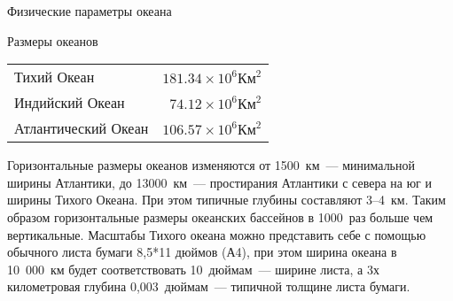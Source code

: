 \begin{chapter}{Физические параметры океана}
\begin{section}{Размеры океанов}
\begin{tabular}{lr}
Тихий Океан         & $181.34 \times 10^6 \mbox{Км}^2$ \\
Индийский Океан     & $ 74.12 \times 10^6 \mbox{Км}^2$ \\
Атлантический Океан & $106.57 \times 10^6 \mbox{Км}^2$ \\
\end{tabular}
%


Горизонтальные размеры океанов изменяются от 1500~км~--- минимальной
ширины Атлантики, до 13000~км~--- простирания Атлантики с севера на юг
и ширины Тихого Океана.  При этом типичные глубины составляют 3--4~км.
Таким образом горизонтальные размеры океанских бассейнов в 1000~раз
больше чем вертикальные.  Масштабы Тихого океана можно представить
себе с помощью обычного листа бумаги 8,5*11 дюймов (А4), при этом
ширина океана в 10~000~км будет соответствовать 10~дюймам~--- ширине
листа, а 3х километровая глубина 0,003~дюймам~--- типичной толщине
листа бумаги.
%



\end{section}
\end{chapter}
